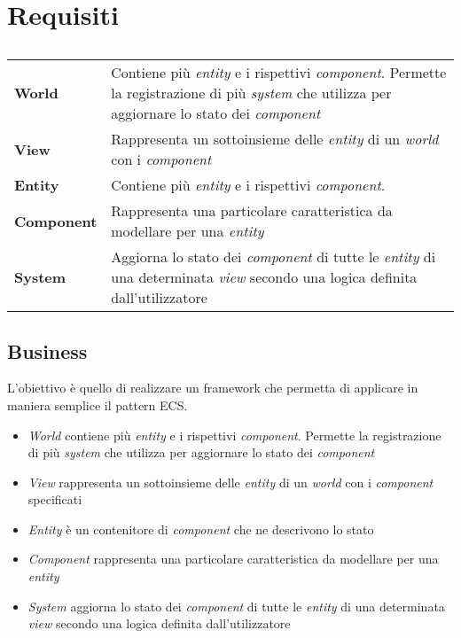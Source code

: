 \chapter{Requisiti}\label{ch:requisiti}

\begin{table}[H]
    \begin{tabular}{p{0.15\linewidth}p{0.85\linewidth}}
        \toprule
        \textbf{World}     & Contiene più \textit{entity} e i rispettivi \textit{component}. Permette la registrazione di più \textit{system} che utilizza per aggiornare lo stato dei \textit{component} \\
        \textbf{View}      & Rappresenta un sottoinsieme delle \textit{entity} di un \textit{world} con i \textit{component}                                                                              \\
        \textbf{Entity}    & Contiene più \textit{entity} e i rispettivi \textit{component}.                                                                                                              \\
        \textbf{Component} & Rappresenta una particolare caratteristica da modellare per una \textit{entity}                                                                                              \\
        \textbf{System}    & Aggiorna lo stato dei \textit{component} di tutte le \textit{entity} di una determinata \textit{view} secondo una logica definita dall'utilizzatore                          \\
        \bottomrule
    \end{tabular}\label{tab:table}
    \caption{\label{Glossario}}
\end{table}

\section{Business}\label{sec:business}
L'obiettivo è quello di realizzare un framework che permetta di applicare in maniera semplice il pattern ECS\@.

\begin{itemize}
    \item \textit{World} contiene più \textit{entity} e i rispettivi \textit{component}.
    Permette la registrazione di più \textit{system} che utilizza per aggiornare lo stato dei \textit{component}
    \item \textit{View} rappresenta un sottoinsieme delle \textit{entity} di un \textit{world} con i \textit{component}
    specificati
    \item \textit{Entity} è un contenitore di \textit{component} che ne descrivono lo stato
    \item \textit{Component} rappresenta una particolare caratteristica da modellare per una \textit{entity}
    \item \textit{System} aggiorna lo stato dei \textit{component} di tutte le \textit{entity} di una determinata \textit{view}
    secondo una logica definita dall'utilizzatore
\end{itemize}

